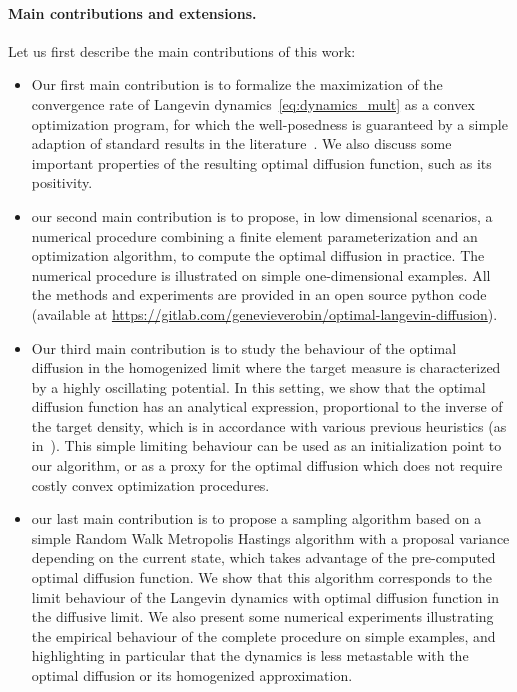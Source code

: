 \documentclass{article}
\begin{document}
\paragraph{Main contributions and extensions.} Let us first describe the main contributions of this work:
\begin{itemize}
\item Our first main contribution is to formalize the maximization of the convergence rate of Langevin dynamics~\eqref{eq:dynamics_mult}  as a convex optimization program, for which the well-posedness is guaranteed by a simple adaption of standard results in the literature~\cite{Henrot}. We also discuss some  important properties of the resulting optimal diffusion function, such as its positivity.
\item our second main contribution is to propose, in low dimensional scenarios, a numerical procedure combining a finite element parameterization and an optimization algorithm, to compute the optimal diffusion in practice. The numerical procedure is illustrated on simple one-dimensional examples. All the methods and experiments are provided in an open source python code (available at \url{https://gitlab.com/genevieverobin/optimal-langevin-diffusion}).
\item Our third main contribution is to study the behaviour of the optimal diffusion in the homogenized limit where the target measure is characterized by a highly oscillating potential. In this setting, we show that the optimal diffusion function has an analytical expression, proportional to the inverse of the target density, which is in accordance with various previous heuristics (as in~\cite{RobertsStramer}). This simple limiting behaviour can be used as an initialization point to our algorithm, or as a proxy for the optimal diffusion which does not require costly convex optimization procedures.
\item our last main contribution is to propose a sampling algorithm based on a simple Random Walk Metropolis Hastings algorithm with a proposal variance depending on the current state, which takes advantage of the pre-computed optimal diffusion function. We show that this algorithm corresponds to the limit behaviour of the Langevin dynamics with optimal diffusion function in the diffusive limit. We also present some numerical experiments illustrating the empirical behaviour of the complete procedure on simple examples, and highlighting in particular that the dynamics is less metastable with the optimal diffusion or its homogenized approximation.
\end{itemize}
\end{document}
